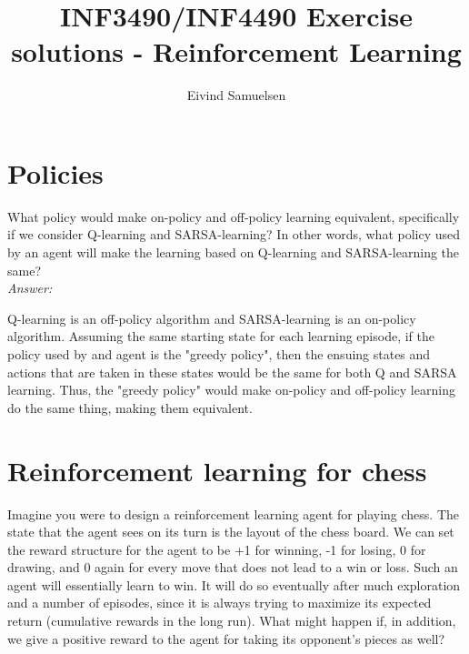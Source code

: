 
\title{\vspace{-2cm}INF3490/INF4490 Exercise solutions - Reinforcement Learning}
\author{Eivind Samuelsen}
\date{}

\setlength\parindent{0pt}


    \renewcommand\marginsymbol[1][0pt]{%
  \tabto*{0cm}\makebox[-1cm][c]{$\mathbb{P}$}\tabto*{\TabPrevPos}}

\maketitle


\section{Policies}
What policy would make on-policy and off-policy learning equivalent,
specifically if we consider Q-learning and SARSA-learning?
In other words, what policy used by an agent will make the learning based on Q-learning and SARSA-learning the same?\\

\textit{Answer:}

Q-learning is an off-policy algorithm and SARSA-learning is an on-policy algorithm.
Assuming the same starting state for each learning episode, if the policy used by and agent is the "greedy policy", then the ensuing states and actions that are taken in these states would be the same for both Q and SARSA learning.
Thus, the "greedy policy" would make on-policy and off-policy learning do the same thing, making them equivalent.

\section{Reinforcement learning for chess}
Imagine you were to design a reinforcement learning agent for playing chess.
The state that the agent sees on its turn is the layout of the chess board.
We can set the reward structure for the agent to be +1 for winning, -1 for losing, 0 for drawing, and 0 again for every move that does not lead to a win or loss.
Such an agent will essentially learn to win.
It will do so eventually after much exploration and a number of episodes, since it is always trying to maximize its expected return (cumulative rewards in the long run).
What might happen if, in addition, we give a positive reward to the agent for taking its opponent's pieces as well?\\

